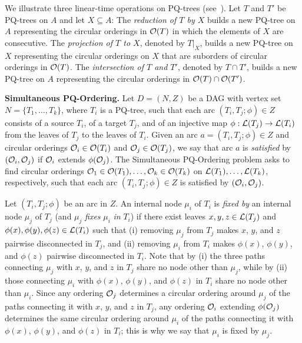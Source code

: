 \documentclass{llncs}
\begin{document}
We illustrate three linear-time operations on PQ-trees (see~\cite{bl-tcop-76,hrl-tsp-13,hm-ppp-04}). Let $T$ and $T'$ be PQ-trees on $A$ and let $X\subseteq A$:
The {\em reduction of $T$ by $X$} builds a new PQ-tree on $A$ representing the circular orderings in ${\cal O}(T)$ in which the elements of $X$ are consecutive.
The {\em projection of $T$ to $X$}, denoted by $T|_X$, builds a new PQ-tree on $X$ representing the circular orderings on $X$ that are suborders of circular orderings in ${\cal O}(T)$.
The {\em intersection of $T$ and $T'$}, denoted by $T \cap T'$, builds a new PQ-tree on $A$ representing the circular orderings in ${\cal O}(T) \cap {\cal O}(T')$.



\smallskip
\noindent
{\bf Simultaneous PQ-Ordering.} Let $D=(N,Z)$ be a DAG with vertex set $N=\{T_1,\dots,T_k\}$, where $T_i$ is a PQ-tree, such that each arc $(T_i,T_j;\phi) \in Z$ consists of a source $T_i$, of a target $T_j$, and of an injective map $\phi: {\cal L}(T_j) \rightarrow {\cal L}(T_i)$ from the leaves of $T_j$ to the leaves of $T_i$. 
Given an arc $a=(T_i,T_j;\phi) \in Z$ and circular orderings ${\cal O}_i \in {\cal O}(T_i)$ and ${\cal O}_j \in {\cal O}(T_j)$, we say that arc $a$ is {\em satisfied} by $({\cal O}_i,{\cal O}_j)$ if ${\cal O}_i$ extends $\phi({\cal O}_j)$.
The {\sc Simultaneous PQ-Ordering} problem asks to find circular orderings ${\cal O}_1 \in {\cal O}(T_1),\dots,{\cal O}_k \in {\cal O}(T_k)$ on ${\cal L}(T_1),\dots,{\cal L}(T_k)$, respectively, such that each arc $(T_i,T_j;\phi) \in Z$ is satisfied by $({\cal O}_i,{\cal O}_j)$.

Let $(T_i,T_j;\phi)$ be an arc in $Z$. 
An internal node $\mu_i$ of $T_i$ is {\em fixed by} an internal node $\mu_j$ of $T_j$ (and $\mu_j$ {\em fixes} $\mu_i$ \emph{in} $T_i$) if there exist leaves $x,y,z \in {\cal L}(T_j)$ and $\phi(x),\phi(y),\phi(z) \in {\cal L}(T_i)$ such that 
(i) removing $\mu_j$ from $T_j$ makes $x$, $y$, and $z$ pairwise disconnected in $T_j$, and
(ii) removing $\mu_i$ from $T_i$ makes $\phi(x)$, $\phi(y)$, and $\phi(z)$ pairwise disconnected in $T_i$.
Note that by (i) the three paths connecting $\mu_j$ with $x$, $y$, and $z$ in $T_j$ share no node other than $\mu_j$, while by (ii) those connecting $\mu_i$ with $\phi(x)$, $\phi(y)$, and $\phi(z)$ in $T_i$ share no node other than $\mu_i$.
Since any ordering ${\cal O}_j$ determines a circular ordering around $\mu_j$ of the paths connecting it with $x$, $y$, and $z$ in $T_j$, any ordering ${\cal O}_i$ extending $\phi({\cal O}_j)$ determines the same circular ordering around $\mu_i$ of the paths connecting it with $\phi(x)$, $\phi(y)$, and $\phi(z)$ in $T_i$; this is why we say that $\mu_i$ is fixed by $\mu_j$.
\end{document}

